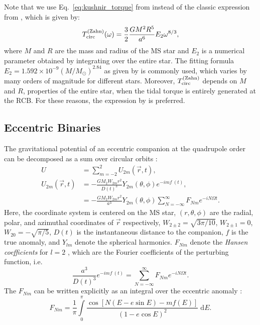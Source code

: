 \documentclass[
        fleqn,
        usenatbib,
    ]{mnras}
\newcommand*{\p}[1]{\left(#1\right)}
\newcommand*{\s}[1]{\left[#1\right]}
\begin{document}
Note that we use Eq.~\eqref{eq:kushnir_torque} from \citet{kushnir} instead of
the classic expression from \citet{zahn1975dynamical}, which is given by:
\begin{equation}
    T_{\rm circ}^{\rm (Zahn)}(\omega) = \frac{3}{2} \frac{GM^2 R^5}{a^6}E_2
        \omega^{8/3},
\end{equation}
where $M$ and $R$ are the mass and radius of the MS star and $E_2$ is a
numerical parameter obtained by integrating over the entire star. The fitting
formula $E_2 = 1.592 \times 10^{-9}\p{M / M_{\odot}}^{2.84}$ as given by
\citet{hurley2002evolution} is commonly used, which varies by many orders of
magnitude for different stars. Moreover, $T_{\rm circ}^{\rm (Zahn)}$ depends on
$M$ and $R$, properties of the entire star, when the tidal torque is entirely
generated at the RCB\@. For these reasons, the expression by \citet{kushnir} is
preferred.

\subsection{Eccentric Binaries}\label{ss:2_eccentric}

The gravitational potential of an eccentric companion at the quadrupole order
can be decomposed as a sum over circular orbits \citep[e.g.][]{sl,vlf}:
\begin{align}
    U &= \sum\limits_{m=-2}^2 U_{2m} \p{\vec{r}, t},\label{eq:u_ecc}\\
    U_{2m}\p{\vec{r}, t} &= -\frac{GM_2 W_{2m} r^2}{D(t)^3}
        Y_{2m}(\theta, \phi) e^{-imf\!\!\!\:(t)},\nonumber\\
        &= -\frac{GM_2W_{2m} r^2}{a^3}Y_{2m}\p{\theta, \phi}
            \sum\limits_{N = -\infty}^\infty \!\!F_{Nm}e^{-iN\Omega t}
            \label{eq:hansen_decomp}.
\end{align}
Here, the coordinate system is centered on the MS star, $(r, \theta, \phi)$ are
the radial, polar, and azimuthal coordinates of $\vec{r}$ respectively, $W_{2
\pm 2} = \sqrt{3\pi/10}$, $W_{2 \pm 1} = 0$, $W_{20} = -\sqrt{\pi / 5}$, $D(t)$
is the instantaneous distance to the companion, $f$ is the true anomaly,
and $Y_{lm}$ denote the spherical harmonics. $F_{Nm}$ denote the \emph{Hansen
coefficients} for $l = 2$ \citep[also denoted $X^n_{2m}$ in][]{murray1999solar},
which are the Fourier coefficients of the perturbing function, i.e.
\begin{equation}
    \frac{a^3}{D(t)^3} e^{-imf\!\!\!\:(t)} = \sum\limits_{N = -\infty}^\infty
        \!\!F_{Nm} e^{-iN\Omega t}.\label{eq:hansen_series}
\end{equation}
The $F_{Nm}$ can be written explicitly as an integral over the eccentric anomaly
\citep{murray1999solar, sl}:
\begin{equation}
    F_{Nm} = \frac{1}{\pi}\int\limits_{0}^{\pi}
        \frac{\cos\s{N\p{E - e\sin E} - mf(E)}}
            {\p{1 - e\cos E}^2}\;\mathrm{d}E.\label{eq:hansen_integral}
\end{equation}
\end{document}
